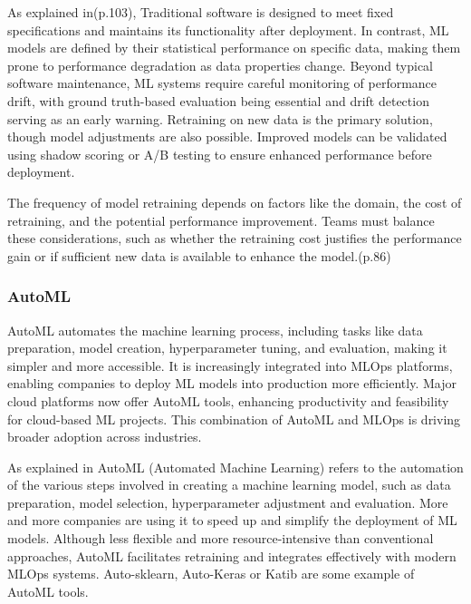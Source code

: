 As explained in\cite{treveil2020introducing}(p.103), Traditional software is designed to meet fixed specifications and maintains its functionality after deployment.
In contrast, ML models are defined by their statistical performance on specific data, making them prone to performance degradation as data properties change.
Beyond typical software maintenance, ML systems require careful monitoring of performance drift,
with ground truth-based evaluation being essential and drift detection serving as an early warning.
Retraining on new data is the primary solution, though model adjustments are also possible.
Improved models can be validated using shadow scoring or A/B testing to ensure enhanced performance before deployment.

The frequency of model retraining depends on factors like the domain, the cost of retraining, and the potential performance improvement.
Teams must balance these considerations, such as whether the retraining cost justifies the performance gain or if sufficient new data is available to enhance the model.\cite{treveil2020introducing}(p.86)

\subsubsection{AutoML}

AutoML automates the machine learning process, including tasks like data preparation, model creation, hyperparameter tuning, and evaluation,
making it simpler and more accessible.
It is increasingly integrated into MLOps platforms, enabling companies to deploy ML models into production more efficiently.
Major cloud platforms now offer AutoML tools, enhancing productivity and feasibility for cloud-based ML projects.
This combination of AutoML and MLOps is driving broader adoption across industries.\cite{gift2021practical,mlops-definition-tools-and-challenge}

As explained in\cite{mlops-definition-tools-and-challenge} AutoML (Automated Machine Learning) refers to the automation of the various steps involved in creating a machine learning model,
such as data preparation, model selection, hyperparameter adjustment and evaluation.
More and more companies are using it to speed up and simplify the deployment of ML models.
Although less flexible and more resource-intensive than conventional approaches, AutoML facilitates retraining and integrates effectively with modern MLOps systems.
Auto-sklearn, Auto-Keras or Katib are some example of AutoML tools.

